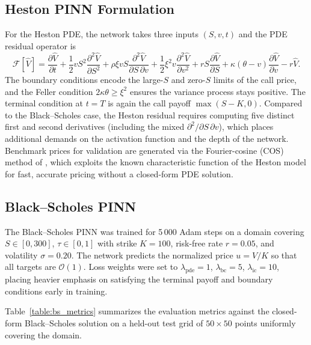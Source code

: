 \subsection{Heston PINN Formulation}\label{subsection:heston_pinn}

For the Heston PDE, the network takes three inputs $(S, v, t)$ and the PDE residual operator is
\[
\mathcal{F}[\hat{V}]
= \frac{\partial \hat{V}}{\partial t}
+ \frac{1}{2}vS^2\frac{\partial^2 \hat{V}}{\partial S^2}
+ \rho\xi v S\frac{\partial^2 \hat{V}}{\partial S\,\partial v}
+ \frac{1}{2}\xi^2 v\frac{\partial^2 \hat{V}}{\partial v^2}
+ rS\frac{\partial \hat{V}}{\partial S}
+ \kappa(\theta-v)\frac{\partial \hat{V}}{\partial v}
- r\hat{V}.
\]
The boundary conditions encode the large-$S$ and zero-$S$ limits of the call price, and the Feller condition $2\kappa\theta \geq \xi^2$ ensures the variance process stays positive. The terminal condition at $t=T$ is again the call payoff $\max(S-K,0)$. Compared to the Black--Scholes case, the Heston residual requires computing five distinct first and second derivatives (including the mixed $\partial^2/\partial S\,\partial v$), which places additional demands on the activation function and the depth of the network. Benchmark prices for validation are generated via the Fourier-cosine (COS) method of \textcite{fang2008cos}, which exploits the known characteristic function of the Heston model for fast, accurate pricing without a closed-form PDE solution.






\subsection{Black--Scholes PINN}\label{subsection:result_bs}

The Black--Scholes PINN was trained for 5\,000 Adam steps on a domain covering $S \in [0, 300]$, $\tau \in [0, 1]$ with strike $K = 100$, risk-free rate $r = 0.05$, and volatility $\sigma = 0.20$. The network predicts the normalized price $u = V/K$ so that all targets are $\mathcal{O}(1)$. Loss weights were set to $\lambda_\text{pde} = 1$, $\lambda_\text{bc} = 5$, $\lambda_\text{ic} = 10$, placing heavier emphasis on satisfying the terminal payoff and boundary conditions early in training.

Table~\ref{table:bs_metrics} summarizes the evaluation metrics against the closed-form Black--Scholes solution on a held-out test grid of $50 \times 50$ points uniformly covering the domain.

